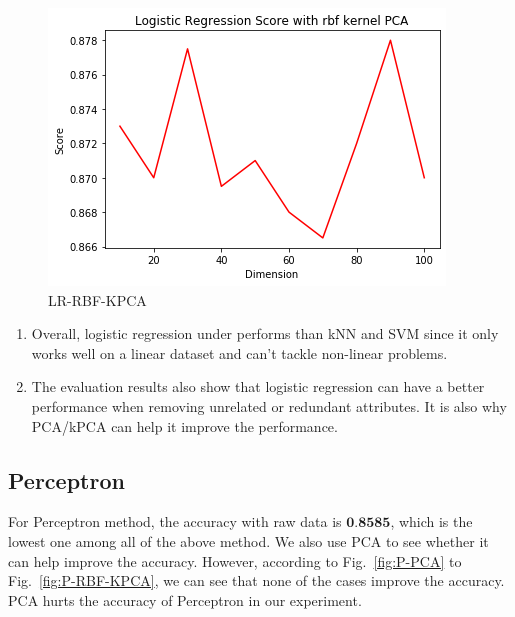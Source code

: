 \documentclass[12pt]{article}
\begin{document}
\begin{figure}[htb]
\begin{minipage}{0.3\textwidth}
		\label{fig:LR-SIG-KPCA}
	\end{minipage}
	\begin{minipage}{0.3\textwidth}
		\centering
		\includegraphics[width=\linewidth]{./exp-figs/LR-RBF-KPCA.png}
		\caption{LR-RBF-KPCA}
		\label{fig:LR-RBF-KPCA}
	\end{minipage}
\end{figure}

\begin{enumerate}[label=(\roman*)]
	\item Overall, logistic regression under performs than kNN and SVM since it only works well on a linear dataset and can't tackle non-linear problems.
	\item The evaluation results also show that logistic regression can have a better performance when removing unrelated or redundant attributes. It is also why PCA/kPCA can help it improve the performance.
\end{enumerate}

\subsection{Perceptron}
For Perceptron method, the accuracy with raw data is $\textbf{0.8585}$, which is the lowest one among all of the above method. We also use PCA to see whether it can help improve the accuracy. However, according to Fig.~\ref{fig:P-PCA} to Fig.~\ref{fig:P-RBF-KPCA}, we can see that none of the cases improve the accuracy. PCA hurts the accuracy of Perceptron in our experiment.
\end{document}
